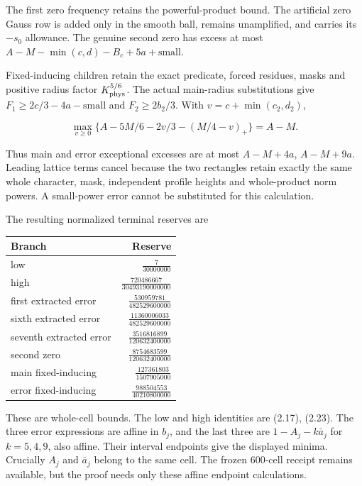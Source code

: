 \documentclass[11pt,a4paper]{article}
\begin{document}
The first zero frequency retains the powerful-product bound. The
artificial zero Gauss row is added only in the smooth ball, remains
unamplified, and carries its \(-s_0\) allowance. The genuine second zero
has excess at most \(A-M-\min(c,d)-B_c+5a+\text{small}\).

Fixed-inducing children retain the exact predicate, forced residues,
masks and positive radius factor \(K_{\rm phys}^{5/6}\). The actual
main-radius substitutions give \(F_1\ge2c/3-4a-\text{small}\) and
\(F_2\ge2b_2/3\). With \(v=c+\min(c_2,d_2)\),

\[
\max_{v\ge0}\{A-5M/6-2v/3-(M/4-v)_+\}=A-M.
\tag{2.24}
\]

Thus main and error exceptional excesses are at most \(A-M+4a\),
\(A-M+9a\). Leading lattice terms cancel because the two rectangles
retain exactly the same whole character, mask, independent profile
heights and whole-product norm powers. A small-power error cannot be
substituted for this calculation.

The resulting normalized terminal reserves are

\begingroup
\renewcommand{\arraystretch}{1.7}

\begingroup
\renewcommand{\arraystretch}{1.7}
\begin{longtable}[]{@{}lr@{}}
\toprule\noalign{}
Branch & Reserve \\
\midrule\noalign{}
\endhead
\bottomrule\noalign{}
\endlastfoot
low & \(\frac{7}{30000000}\) \\
high & \(\frac{720486667}{30493190000000}\) \\
first extracted error & \(\frac{530959781}{482529600000}\) \\
sixth extracted error & \(\frac{11360006033}{482529600000}\) \\
seventh extracted error & \(\frac{3516816899}{120632400000}\) \\
second zero & \(\frac{8754683599}{120632400000}\) \\
main fixed-inducing & \(\frac{127361803}{1507905000}\) \\
error fixed-inducing & \(\frac{988504553}{40210800000}\) \\
\end{longtable}
\endgroup

\endgroup

These are whole-cell bounds. The low and high identities are (2.17),
(2.23). The three error expressions are affine in \(b_j\), and the last
three are \(1-A_j-k\bar a_j\) for \(k=5,4,9\), also affine. Their
interval endpoints give the displayed minima. Crucially \(A_j\) and
\(\bar a_j\) belong to the same cell. The frozen 600-cell receipt
remains available, but the proof needs only these affine endpoint
calculations.
\end{document}
